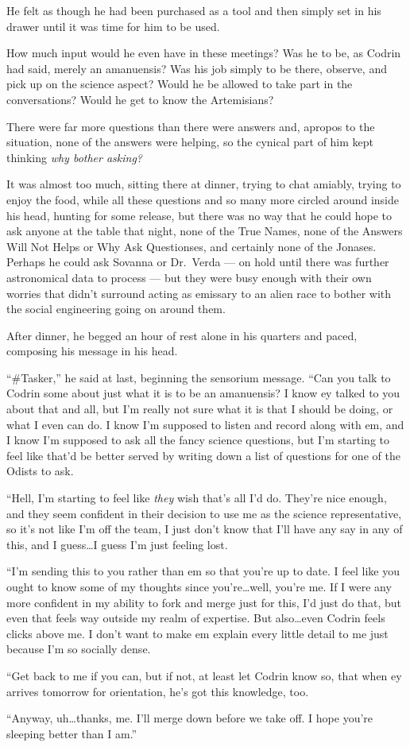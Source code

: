 He felt as though he had been purchased as a tool and then simply set in his drawer until it was time for him to be used.

How much input would he even have in these meetings? Was he to be, as Codrin had said, merely an amanuensis? Was his job simply to be there, observe, and pick up on the science aspect? Would he be allowed to take part in the conversations? Would he get to know the Artemisians?

There were far more questions than there were answers and, apropos to the situation, none of the answers were helping, so the cynical part of him kept thinking \emph{why bother asking?}

It was almost too much, sitting there at dinner, trying to chat amiably, trying to enjoy the food, while all these questions and so many more circled around inside his head, hunting for some release, but there was no way that he could hope to ask anyone at the table that night, none of the True Names, none of the Answers Will Not Helps or Why Ask Questionses, and certainly none of the Jonases. Perhaps he could ask Sovanna or Dr.~Verda — on hold until there was further astronomical data to process — but they were busy enough with their own worries that didn't surround acting as emissary to an alien race to bother with the social engineering going on around them.

After dinner, he begged an hour of rest alone in his quarters and paced, composing his message in his head.

``\#Tasker,'' he said at last, beginning the sensorium message. ``Can you talk to Codrin some about just what it is to be an amanuensis? I know ey talked to you about that and all, but I'm really not sure what it is that I should be doing, or what I even can do. I know I'm supposed to listen and record along with em, and I know I'm supposed to ask all the fancy science questions, but I'm starting to feel like that'd be better served by writing down a list of questions for one of the Odists to ask.

``Hell, I'm starting to feel like \emph{they} wish that's all I'd do. They're nice enough, and they seem confident in their decision to use me as the science representative, so it's not like I'm off the team, I just don't know that I'll have any say in any of this, and I guess\ldots I guess I'm just feeling lost.

``I'm sending this to you rather than em so that you're up to date. I feel like you ought to know some of my thoughts since you're\ldots well, you're me. If I were any more confident in my ability to fork and merge just for this, I'd just do that, but even that feels way outside my realm of expertise. But also\ldots even Codrin feels clicks above me. I don't want to make em explain every little detail to me just because I'm so socially dense.

``Get back to me if you can, but if not, at least let Codrin know so, that when ey arrives tomorrow for orientation, he's got this knowledge, too.

``Anyway, uh\ldots thanks, me. I'll merge down before we take off. I hope you're sleeping better than I am.''
